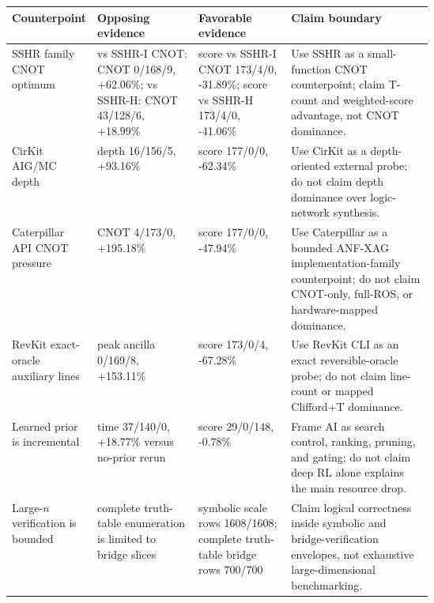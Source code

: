 \begin{tabularx}{\linewidth}{>{\raggedright\arraybackslash}p{0.16\linewidth}>{\raggedright\arraybackslash}p{0.24\linewidth}>{\raggedright\arraybackslash}p{0.22\linewidth}>{\raggedright\arraybackslash}X}
\toprule
Counterpoint & Opposing evidence & Favorable evidence & Claim boundary \\
\midrule
SSHR family CNOT optimum & vs SSHR-I CNOT: CNOT 0/168/9, +62.06\%; vs SSHR-H: CNOT 43/128/6, +18.99\% & score vs SSHR-I CNOT 173/4/0, -31.89\%; score vs SSHR-H 173/4/0, -41.06\% & Use SSHR as a small-function CNOT counterpoint; claim T-count and weighted-score advantage, not CNOT dominance. \\
CirKit AIG/MC depth & depth 16/156/5, +93.16\% & score 177/0/0, -62.34\% & Use CirKit as a depth-oriented external probe; do not claim depth dominance over logic-network synthesis. \\
Caterpillar API CNOT pressure & CNOT 4/173/0, +195.18\% & score 177/0/0, -47.94\% & Use Caterpillar as a bounded ANF-XAG implementation-family counterpoint; do not claim CNOT-only, full-ROS, or hardware-mapped dominance. \\
RevKit exact-oracle auxiliary lines & peak ancilla 0/169/8, +153.11\% & score 173/0/4, -67.28\% & Use RevKit CLI as an exact reversible-oracle probe; do not claim line-count or mapped Clifford+T dominance. \\
Learned prior is incremental & time 37/140/0, +18.77\% versus no-prior rerun & score 29/0/148, -0.78\% & Frame AI as search control, ranking, pruning, and gating; do not claim deep RL alone explains the main resource drop. \\
Large-$n$ verification is bounded & complete truth-table enumeration is limited to bridge slices & symbolic scale rows 1608/1608; complete truth-table bridge rows 700/700 & Claim logical correctness inside symbolic and bridge-verification envelopes, not exhaustive large-dimensional benchmarking. \\
\bottomrule
\end{tabularx}
